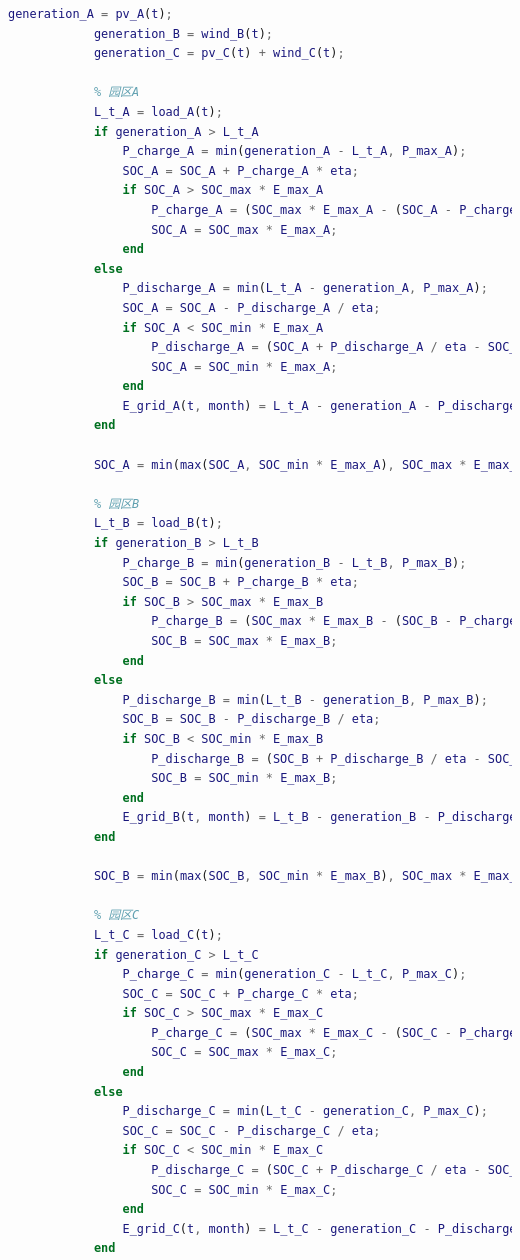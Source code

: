 \documentclass{cumcmthesis}
\begin{document}
\begin{appendices}
\begin{lstlisting}[language=Matlab]
            generation_A = pv_A(t);
            generation_B = wind_B(t);
            generation_C = pv_C(t) + wind_C(t);

            % 园区A
            L_t_A = load_A(t);
            if generation_A > L_t_A
                P_charge_A = min(generation_A - L_t_A, P_max_A);
                SOC_A = SOC_A + P_charge_A * eta;
                if SOC_A > SOC_max * E_max_A
                    P_charge_A = (SOC_max * E_max_A - (SOC_A - P_charge_A * eta)) / eta;
                    SOC_A = SOC_max * E_max_A;
                end
            else
                P_discharge_A = min(L_t_A - generation_A, P_max_A);
                SOC_A = SOC_A - P_discharge_A / eta;
                if SOC_A < SOC_min * E_max_A
                    P_discharge_A = (SOC_A + P_discharge_A / eta - SOC_min * E_max_A) * eta;
                    SOC_A = SOC_min * E_max_A;
                end
                E_grid_A(t, month) = L_t_A - generation_A - P_discharge_A;
            end

            SOC_A = min(max(SOC_A, SOC_min * E_max_A), SOC_max * E_max_A);

            % 园区B
            L_t_B = load_B(t);
            if generation_B > L_t_B
                P_charge_B = min(generation_B - L_t_B, P_max_B);
                SOC_B = SOC_B + P_charge_B * eta;
                if SOC_B > SOC_max * E_max_B
                    P_charge_B = (SOC_max * E_max_B - (SOC_B - P_charge_B * eta)) / eta;
                    SOC_B = SOC_max * E_max_B;
                end
            else
                P_discharge_B = min(L_t_B - generation_B, P_max_B);
                SOC_B = SOC_B - P_discharge_B / eta;
                if SOC_B < SOC_min * E_max_B
                    P_discharge_B = (SOC_B + P_discharge_B / eta - SOC_min * E_max_B) * eta;
                    SOC_B = SOC_min * E_max_B;
                end
                E_grid_B(t, month) = L_t_B - generation_B - P_discharge_B;
            end

            SOC_B = min(max(SOC_B, SOC_min * E_max_B), SOC_max * E_max_B);

            % 园区C
            L_t_C = load_C(t);
            if generation_C > L_t_C
                P_charge_C = min(generation_C - L_t_C, P_max_C);
                SOC_C = SOC_C + P_charge_C * eta;
                if SOC_C > SOC_max * E_max_C
                    P_charge_C = (SOC_max * E_max_C - (SOC_C - P_charge_C * eta)) / eta;
                    SOC_C = SOC_max * E_max_C;
                end
            else
                P_discharge_C = min(L_t_C - generation_C, P_max_C);
                SOC_C = SOC_C - P_discharge_C / eta;
                if SOC_C < SOC_min * E_max_C
                    P_discharge_C = (SOC_C + P_discharge_C / eta - SOC_min * E_max_C) * eta;
                    SOC_C = SOC_min * E_max_C;
                end
                E_grid_C(t, month) = L_t_C - generation_C - P_discharge_C;
            end


\end{lstlisting}
\end{appendices}
\end{document}
